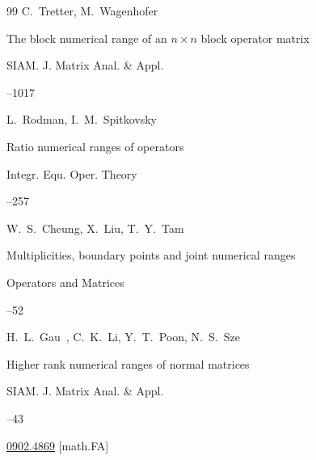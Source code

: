 \begin{thebibliography}{99}
\by C.~Tretter, M.~Wagenhofer

\paper The block numerical range of an $n \times n$ block operator matrix 

\jour SIAM. J. Matrix Anal. \& Appl.




--1017





\by L.~Rodman, I.~M.~Spitkovsky

\paper Ratio numerical ranges of operators  

\jour Integr. Equ. Oper. Theory



--257






\by W.~S.~Cheung, X.~Liu, T.~Y.~Tam

\paper Multiplicities, boundary points and joint numerical ranges 

\jour Operators and Matrices 




--52





\by H.~L.~Gau~, C.~K.~Li, Y.~T.~Poon, N.~S.~Sze

\paper Higher rank numerical ranges of normal matrices 

\jour  SIAM. J. Matrix Anal. \& Appl.



--43


\arxiv \href{http://arxiv.org/abs/0902.4869}{0902.4869} [math.FA]





\end{thebibliography}
